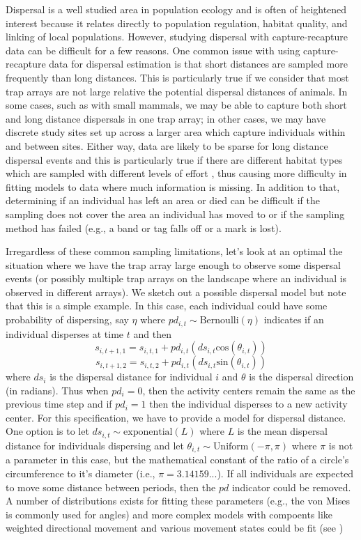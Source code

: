Dispersal is a well studied area in population ecology and is often of heightened 
interest because it relates directly to population regulation, habitat quality, and
linking of local populations.  However, studying dispersal with capture-recapture data can be
difficult for a few reasons. 
One common issue with using capture-recapture data for dispersal
estimation is that short distances are sampled more frequently than
long distances.  This is particularly true if we consider that most
trap arrays are not large relative the potential dispersal distances
of animals.  In some cases, such as with small mammals, we may be able
to capture both short and long distance dispersals in one trap array;
in other cases, we may have discrete study sites set up across a larger
area which capture individuals within and between sites.  Either way,
data are likely to be sparse for long distance dispersal events and
this is particularly true if there are different habitat types which
are sampled with different levels of effort
\citep{ovaskainen_etal:2008}, thus causing more difficulty in fitting
models to data where much information is missing.
In addition to that, determining if an
individual has left an area or died can be difficult if the sampling
does not cover the area an individual has moved to or if the sampling
method has failed (e.g., a band or tag falls off or a mark is lost).

Irregardless of these common sampling limitations, let's look at an optimal the situation where we have the trap array large
enough to observe some dispersal events (or possibly multiple trap
arrays on the landscape where an individual is observed in different
arrays).  We sketch out a possible dispersal model but note that this
is a simple example.  In this case, each individual could have some
probability of dispersing, say $\eta$ where $pd_{i,t} \sim
\mbox{Bernoulli}(\eta)$ indicates if an individual disperses at time
$t$ and then
\[
s_{i,t+1,1}= s_{i,t,1} + pd_{i,t} (ds_{i, t} \mbox{cos}(\theta_{i,t}))
\]
\[
s_{i,t+1,2}= s_{i,t,2} + pd_{i,t} (ds_{i,t} \mbox{sin}(\theta_{i,t}))
\]
where $ds_i$ is the dispersal distance for individual $i$ and $\theta$
is the dispersal direction (in radians).
Thus when $pd_i =0$, then the activity
centers remain the same as the previous time step and if $pd_i = 1$
then the individual disperses to a new activity center.  
For this specification, we have to provide a model for dispersal distance.
One option is
to let $ds_{i,t} \sim \mbox{exponential}(L)$ where $L$ is the mean
dispersal distance for individuals dispersing and let $\theta_{i,t}
\sim \mbox{Uniform}(-\pi, \pi)$
where $\pi$ is not a parameter in this case, but the mathematical 
constant of the ratio of a circle's circumference to it's diameter 
(i.e., $\pi = 3.14159...$).
If all individuals are expected to
move some distance between periods, then the $pd$ indicator could be
removed.  A number of distributions exists for fitting these
parameters (e.g., the von Mises is commonly used for angles) and more
complex models with compoents like weighted directional movement and
various movement states could be
fit (see \cite{jonsen_etal:2005, johnson_etal:2008b, mcclintock_etal:2012})



